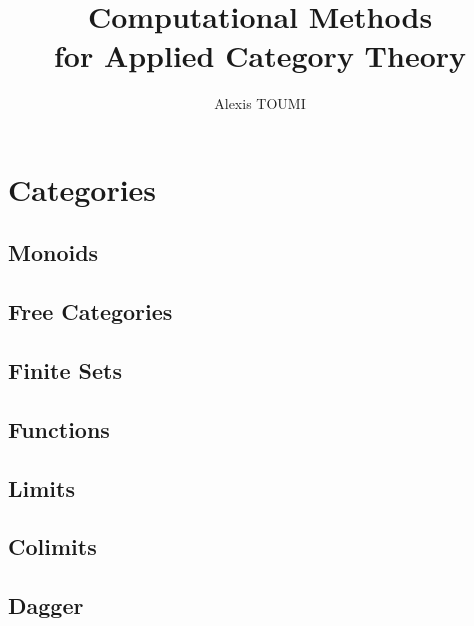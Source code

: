 

\title{Computational Methods\\
for Applied Category Theory}
\author{Alexis TOUMI}

\degreedate{\today}


\begin{romanpages}
\maketitle



\tableofcontents

\end{romanpages}

\chapter{Categories}

\section{Monoids}
\section{Free Categories}
\section{Finite Sets}
\section{Functions}
\section{Limits}
\section{Colimits}
\section{Dagger}
